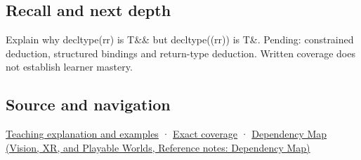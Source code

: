 \subsection{Recall and next depth}\label{appendix-5d4252a42886-recall-and-next-depth}

Explain why decltype(rr) is T\&\& but decltype((rr)) is T\&. Pending: constrained deduction, structured bindings and return-type deduction. Written coverage does not establish learner mastery.

\subsection{Source and navigation}\label{appendix-5d4252a42886-source-and-navigation}

\hyperref[01-foundations-i-ch003-an-expression-has-a-type-and-a-category]{Teaching explanation and examples} · \hyperref[appendix-fd090d982a15-m008---parts-113-126]{Exact coverage} · \href{../07-Vision-XR-and-Playable-Worlds/main.pdf\#nameddest=appendix-4ad47bdd269a}{Dependency Map (Vision, XR, and Playable Worlds, Reference notes: Dependency Map)}
